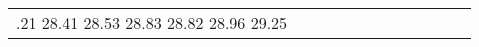 \documentclass[runningheads]{llncs}
\begin{document}
\begin{table}[!ht]
\begin{tabular}{|p{7em}|p{2.5em}|p{2.5em}|p{3em}|p{2.5em}|p{3em}|p{2.5em}|p{3em}|p{2.5em}|p{3em}|p{2.5em}|p{3em}|}
.21 \newline{}28.41 \newline{}28.53 \newline{}28.83 \newline{}28.82 \newline{}28.96 \newline{}29.25 \n
\end{tabular}
\end{table}
\end{document}
